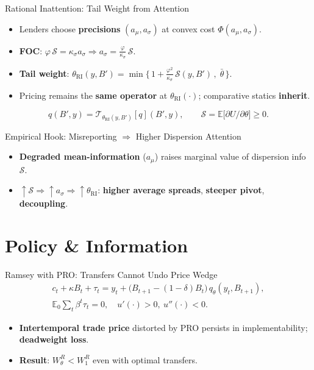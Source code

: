 \documentclass[aspectratio=169,11pt,professionalfonts]{beamer}
\newcommand{\E}{\mathbb{E}}
\newcommand{\1}{\mathbb{1}}
\begin{document}
\begin{frame}{Rational Inattention: Tail Weight from Attention}
  \begin{itemize}
    \item Lenders choose \textbf{precisions} $(a_\mu,a_\sigma)$ at convex cost
          $\Phi(a_\mu,a_\sigma)$.
    \item \textbf{FOC}: $\varphi\,\mathcal S=\kappa_\sigma a_\sigma\Rightarrow a_\sigma=\tfrac{\varphi}{\kappa_\sigma}\,\mathcal S$.
    \item \textbf{Tail weight}: $\displaystyle \theta_{\mathrm{RI}}(y,B')=\min\Big\{\,1+\frac{\varphi^2}{\kappa_\sigma}\,\mathcal S(y,B')\,,\;\bar\theta\,\Big\}$.
    \item Pricing remains the \textbf{same operator} at $\theta_{\mathrm{RI}}(\cdot)$;
          comparative statics \textbf{inherit}.
  \end{itemize}
  \vspace{0.5em}
  \begin{equation*}
    q(B',y)=\mathcal T_{\theta_{\mathrm{RI}}(y,B')}[q](B',y),\qquad \mathcal S=\E\Big[\partial U/\partial\theta\Big]\ge0.
  \end{equation*}
\end{frame}

\begin{frame}{Empirical Hook: Misreporting \texorpdfstring{$\Rightarrow$}{=>} Higher Dispersion Attention}
  \begin{itemize}
    \item \textbf{Degraded mean-information} ($a_\mu$) raises marginal value of dispersion info $\mathcal S$.
    \item $\uparrow\mathcal S\Rightarrow \uparrow a_\sigma\Rightarrow \uparrow \theta_{\mathrm{RI}}$: \textbf{higher average spreads}, \textbf{steeper pivot}, \textbf{decoupling}.
  \end{itemize}
\end{frame}

\section{Policy \& Information}

\begin{frame}{Ramsey with PRO: Transfers Cannot Undo Price Wedge}
  \begin{gather*}
    c_t+\kappa B_t+\tau_t = y_t+\big(B_{t+1}-(1{-}\delta)B_t\big)\,q_{\theta}(y_t,B_{t+1}),\\
    \E_0\sum_t \beta^t\tau_t=0,\quad u'(\cdot)>0,\ u''(\cdot)<0.
  \end{gather*}
  \begin{itemize}
    \item \textbf{Intertemporal trade price} distorted by PRO persists in implementability; \textbf{deadweight loss}.
    \item \textbf{Result}: $W^R_{\theta}<W^R_1$ even with optimal transfers.
  \end{itemize}
\end{frame}
\end{document}
